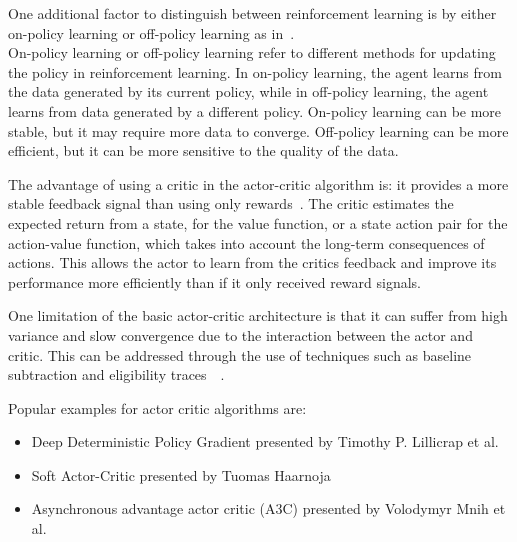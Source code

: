 One additional factor to distinguish between reinforcement learning is by either on-policy learning or off-policy learning as in~\cite{SuttonBartoRLBook}. \\
On-policy learning or off-policy learning refer to different methods for updating the policy in reinforcement learning. In on-policy learning, the agent learns from the data generated by its current policy, while in off-policy learning, the agent learns from data generated by a different policy. On-policy learning can be more stable, but it may require more data to converge. Off-policy learning can be more efficient, but it can be more sensitive to the quality of the data.

The advantage of using a critic in the actor-critic algorithm is: it provides a more stable feedback signal than using only rewards~\cite{SpinningUp2018}. The critic estimates the expected return from a state, for the value function, or a state action pair for the action-value function, which takes into account the long-term consequences of actions. This allows the actor to learn from the critics feedback and improve its performance more efficiently than if it only received reward signals. %

One limitation of the basic actor-critic architecture is that it can suffer from high variance and slow convergence due to the interaction between the actor and critic. This can be addressed through the use of techniques such as baseline subtraction and eligibility traces~\cite{SpinningUp2018}~\cite{SuttonBartoRLBook}.

Popular examples for actor critic algorithms are:
\begin{itemize}
	\item Deep Deterministic Policy Gradient presented by Timothy P. Lillicrap et al.~\cite{DDPG_Paper}
	\item Soft Actor-Critic presented by Tuomas Haarnoja~\cite{SAC_Paper}
	\item Asynchronous advantage actor critic (A3C) presented by Volodymyr Mnih et al.~\cite{A3C_Paper}
\end{itemize}



